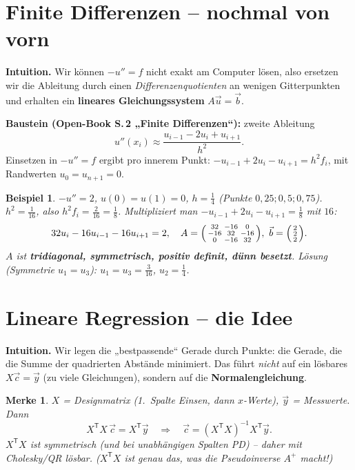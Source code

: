 \documentclass[a4paper,11pt]{article}
\newenvironment{psmallmatrix}{\left(\begin{smallmatrix}}{\end{smallmatrix}\right)}
\newcommand{\transp}{^{\mathsf{T}}}
\theoremstyle{def0}
\newtheorem*{merke}{\textcolor{good}{Merke}}
\newtheorem*{bsp}{Beispiel}
\begin{document}
\section{Finite Differenzen -- nochmal von vorn}

\textbf{Intuition.} Wir können $-u''=f$ nicht exakt am Computer lösen, also ersetzen wir
die Ableitung durch einen \emph{Differenzenquotienten} an wenigen Gitterpunkten und
erhalten ein \textbf{lineares Gleichungssystem} $A\vec u=\vec b$.

\textbf{Baustein (Open-Book S.\,2 „Finite Differenzen“):} zweite Ableitung
\[
u''(x_i)\approx\frac{u_{i-1}-2u_i+u_{i+1}}{h^2}.
\]
Einsetzen in $-u''=f$ ergibt pro innerem Punkt:
$-u_{i-1}+2u_i-u_{i+1}=h^2 f_i$, mit Randwerten $u_0=u_{n+1}=0$.

\begin{bsp}
$-u''=2$, $u(0)=u(1)=0$, $h=\tfrac14$ (Punkte $0{,}25;0{,}5;0{,}75$). $h^2=\tfrac1{16}$,
also $h^2f_i=\tfrac{2}{16}=\tfrac18$. Multipliziert man $-u_{i-1}+2u_i-u_{i+1}=\tfrac18$
mit $16$:
\[
32u_i-16u_{i-1}-16u_{i+1}=2,\quad
A=\begin{psmallmatrix}32&-16&0\\-16&32&-16\\0&-16&32\end{psmallmatrix},\
\vec b=\begin{psmallmatrix}2\\2\\2\end{psmallmatrix}.
\]
$A$ ist \textbf{tridiagonal, symmetrisch, positiv definit, dünn besetzt}.
Lösung (Symmetrie $u_1=u_3$): $u_1=u_3=\tfrac{3}{16}$, $u_2=\tfrac14$.
\end{bsp}

\section{Lineare Regression -- die Idee}

\textbf{Intuition.} Wir legen die „bestpassende“ Gerade durch Punkte: die Gerade, die die
Summe der quadrierten Abstände minimiert. Das führt \emph{nicht} auf ein lösbares
$X\vec c=\vec y$ (zu viele Gleichungen), sondern auf die \textbf{Normalengleichung}.

\begin{merke}
$X$ = Designmatrix (1.\ Spalte Einsen, dann $x$-Werte), $\vec y$ = Messwerte. Dann
\[
X\transp X\,\vec c = X\transp\vec y\quad\Longrightarrow\quad
\vec c=(X\transp X)^{-1}X\transp\vec y .
\]
$X\transp X$ ist symmetrisch (und bei unabhängigen Spalten PD) -- daher mit
Cholesky/QR lösbar. ($X\transp X$ ist genau das, was die Pseudoinverse $A^{+}$ macht!)
\end{merke}
\end{document}

